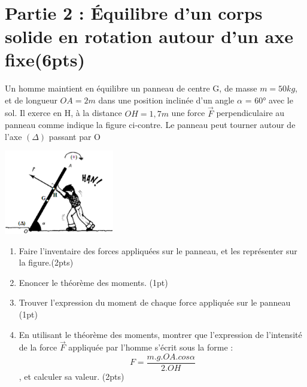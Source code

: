 \documentclass[12pt]{article}
\begin{document}
\vspace{3cm}

\hrulefill\\
\section*{Partie 2 : Équilibre d'un corps solide en rotation autour d'un axe fixe\dotfill(6pts)}
Un homme maintient en équilibre un panneau de centre G, de
masse $m = 50kg$, et de longueur $OA = 2m$ dans une position
inclinée d’un angle $\alpha$ = 60° avec le sol. Il exerce en H, à la
distance $OH = 1,7m$ une force $\vec{F}$ perpendiculaire au panneau
comme indique la figure ci-contre. Le panneau peut tourner
autour de l’axe $(\Delta)$ passant par O

\begin{center}

    \includegraphics[width=0.36\textwidth]{./img/rotation.png}
\end{center}
\begin{enumerate}
    \item Faire l’inventaire des forces appliquées sur le panneau, et les
        représenter sur la figure.\dotfill(2pts)
    \item Enoncer le théorème des moments. \dotfill(1pt)
\item Trouver l’expression du moment de chaque force appliquée
    sur le panneau \dotfill(1pt)
\item En utilisant le théorème des moments, montrer que l’expression de l’intensité de la force $\vec{F}$ appliquée par l’homme s'écrit sous la forme :$$F = \frac{m.g.OA.cos\alpha}{2.OH}$$
    , et calculer sa valeur. \dotfill(2pts)
        \end{enumerate}
\end{document}
